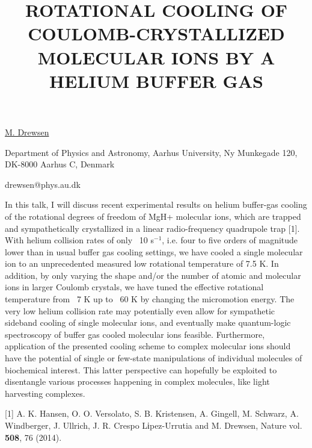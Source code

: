 \title{ROTATIONAL COOLING OF COULOMB-CRYSTALLIZED MOLECULAR IONS BY A HELIUM BUFFER GAS}

\underline{M. Drewsen} 

{\normalsize{\vspace{-4mm}
Department of Physics and Astronomy,
Aarhus University,
Ny Munkegade 120,
DK-8000 Aarhus C,
Denmark

\email drewsen@phys.au.dk}}

In this talk, I will discuss recent experimental results on helium buffer-gas cooling of the rotational degrees of freedom of MgH+ molecular ions, which are trapped and sympathetically crystallized in a linear radio-frequency quadrupole trap [1]. With helium collision rates of only ~10 s$^{-1}$, i.e. four to five orders of magnitude lower than in usual buffer gas cooling settings, we have cooled a single molecular ion to an unprecedented measured low rotational temperature of 7.5 K. In addition, by only varying the shape and/or the number of atomic and molecular ions in larger Coulomb crystals, we have tuned the effective rotational temperature from ~7 K up to ~60 K by changing the micromotion energy. The very low helium collision rate may potentially even allow for sympathetic sideband cooling of single molecular ions, and eventually make quantum-logic spectroscopy of buffer gas cooled molecular ions feasible. Furthermore, application of the presented cooling scheme to complex molecular ions should have the potential of single or few-state manipulations of individual molecules of biochemical interest. This latter perspective can hopefully be exploited to disentangle various processes happening in complex molecules, like light harvesting complexes.

{\normalsize
[1]	A. K. Hansen, O. O. Versolato, S. B. Kristensen, A. Gingell, M. Schwarz,
    A. Windberger, J. Ullrich, J. R. Crespo Lіpez-Urrutia and M. Drewsen, Nature vol. \textbf{508}, 76 (2014).
}


\vspace{\baselineskip}
